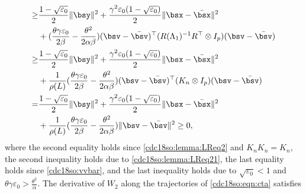\documentclass[letterpaper, 10 pt, conference]{ieeeconf}  %
\begin{document}
\begin{align}
\ge&\frac{1-\sqrt{\varepsilon_0}}{2}\|\bsy\|^2
+\frac{\gamma^2\varepsilon_0(1-\sqrt{\varepsilon_0})}{2}\|\bsx-\bar{\bsx}\|^2\nonumber\\
&+(\frac{\theta\gamma\varepsilon_0}{2\beta}-\frac{\theta^2}{2\alpha\beta})(\bsv-\bar{\bsv})^\top (R(\Lambda_1)^{-1}R^\top \otimes I_p)(\bsv-\bar{\bsv})\nonumber\\
\ge&\frac{1-\sqrt{\varepsilon_0}}{2}\|\bsy\|^2
+\frac{\gamma^2\varepsilon_0(1-\sqrt{\varepsilon_0})}{2}\|\bsx-\bar{\bsx}\|^2\nonumber\\
&+\frac{1}{\rho(L)}(\frac{\theta\gamma\varepsilon_0}{2\beta}-\frac{\theta^2}{2\alpha\beta})(\bsv-\bar{\bsv})^\top (K_n \otimes I_p)(\bsv-\bar{\bsv})\nonumber\\
=&\frac{1-\sqrt{\varepsilon_0}}{2}\|\bsy\|^2
+\frac{\gamma^2\varepsilon_0(1-\sqrt{\varepsilon_0})}{2}\|\bsx-\bar{\bsx}\|^2\nonumber\\
&+\frac{1}{\rho(L)}(\frac{\theta\gamma\varepsilon_0}{2\beta}-\frac{\theta^2}{2\alpha\beta})
\|\bsv-\bar{\bsv}\|^2\ge0,
\end{align}
where the second equality holds since  \eqref{cdc18so:lemma:LReq2} and $K_nK_n=K_n$, the second inequality holds due to \eqref{cdc18so:lemma:LReq21}, the last equality holds since \eqref{cdc18so:vvbar}, and the last inequality holds due to $\sqrt{\varepsilon_0}<1$ and $\theta\gamma\varepsilon_0>\frac{\theta^2}{\alpha}$.
The derivative of $W_2$ along the trajectories of \eqref{cdc18so:eqn:cta} satisfies
\end{document}
